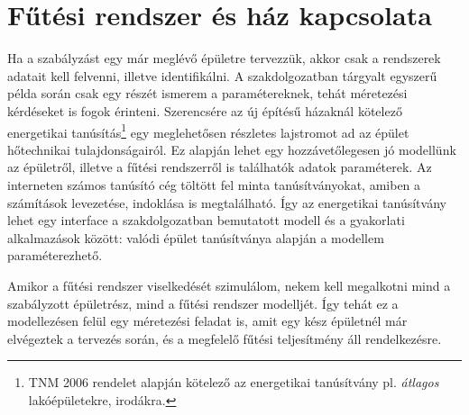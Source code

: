 

\section{Fűtési rendszer és ház kapcsolata}

Ha a szabályzást egy már meglévő épületre tervezzük, akkor csak a rendszerek adatait kell felvenni, illetve identifikálni. A szakdolgozatban tárgyalt egyszerű példa során csak egy részét ismerem a paramétereknek, tehát méretezési kérdéseket is fogok érinteni.  Szerencsére az új építésű házaknál kötelező energetikai tanúsítás\footnote{TNM 2006 rendelet alapján kötelező az energetikai tanúsítvány pl. \textit{átlagos} lakóépületekre, irodákra.} egy meglehetősen részletes lajstromot ad az épület hőtechnikai tulajdonságairól. Ez alapján lehet egy hozzávetőlegesen jó modellünk az épületről, illetve a fűtési rendszerről is találhatók adatok paraméterek. Az interneten számos tanúsító cég töltött fel minta tanúsítványokat, amiben a számítások levezetése, indoklása is megtalálható. Így az energetikai tanúsítvány lehet egy interface a szakdolgozatban bemutatott modell és a gyakorlati alkalmazások között: valódi épület tanúsítványa alapján a modellem paraméterezhető.


Amikor a fűtési rendszer viselkedését szimulálom, nekem kell megalkotni mind a szabályzott épületrész, mind a fűtési rendszer modelljét. Így tehát ez a modellezésen felül egy méretezési feladat is, amit egy kész épületnél már elvégeztek a tervezés során, és a megfelelő fűtési teljesítmény áll rendelkezésre. %






%
%
%




\pagebreak
